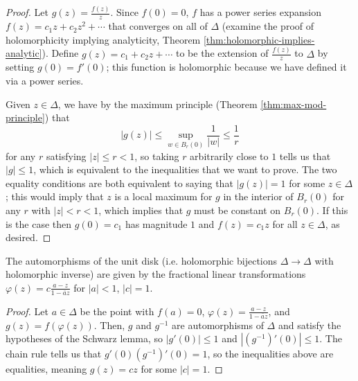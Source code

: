 \documentclass[10pt]{article}
\providecommand{\ol}{\overline}
\providecommand{\inv}{^{-1}}
\providecommand{\abs}[1]{\left\lvert{#1}\right\rvert}
\begin{document}
\begin{proof}
    Let $g(z) = \frac{f(z)}{z}$.
    Since $f(0) = 0$, $f$ has a power series
    expansion $f(z) = c_1z + c_2z^2 + \cdots$
    that converges on all of $\Delta$
    (examine the proof of holomorphicity implying analyticity,
    Theorem \ref{thm:holomorphic-implies-analytic}).
    Define $g(z) = c_1 + c_2z + \cdots$
    to be the extension of $\frac{f(z)}z$ to $\Delta$
    by setting $g(0) = f'(0)$; this function is holomorphic
    because we have defined it via a power series.

    Given $z\in\Delta$, we have by the maximum principle
    (Theorem \ref{thm:max-mod-principle}) that
    \begin{equation*}
	\abs{g(z)} \le \sup_{w\in B_r(0)} \frac 1{\abs w}
	\le \frac 1r
    \end{equation*}
    for any $r$ satisfying $\abs z \le r < 1$,
    so taking $ r$ arbitrarily close to $1$ tells us that
    $\abs g \le 1$, which is equivalent to the inequalities
    that we want to prove. The two equality conditions
    are both equivalent to saying that $\abs{g(z)} = 1$
    for some $z\in\Delta$; this would imply that
    $z$ is a local maximum for $g$ in the interior of
    $B_r(0)$ for any $r$ with $\abs z < r < 1$,
    which implies that $g$ must be constant on $B_r(0)$.
    If this is the case then $g(0) = c_1$ has magnitude $1$
    and $f(z) = c_1z$ for all $z\in\Delta$, as desired.
\end{proof}

\begin{corollary}
    \label{coro:automorphism-disk}
    The automorphisms of the unit disk
    (i.e. holomorphic bijections $\Delta\to\Delta$ with holomorphic inverse)
    are given by the fractional linear transformations
    $\varphi(z) = c\frac{a-z}{1-\ol az}$
    for $\abs a < 1$, $\abs c = 1$.
\end{corollary}

\begin{proof}
    Let $a\in\Delta$ be the point with $f(a) = 0$,
    $\varphi(z) = \frac{a-z}{1-\ol az}$,
    and $g(z) = f(\varphi(z))$. Then, $g$ and $g\inv$
    are automorphisms of $\Delta$ and satisfy the hypotheses
    of the Schwarz lemma, so $\abs{g'(0)}\le 1$
    and $\abs{(g\inv)'(0)}\le 1$.
    The chain rule tells us that $g'(0)(g\inv)'(0) = 1$,
    so the inequalities above are equalities,
    meaning $g(z) = cz$ for some $\abs c = 1$.
\end{proof}

\pagebreak
\listoftodos
\end{document}
